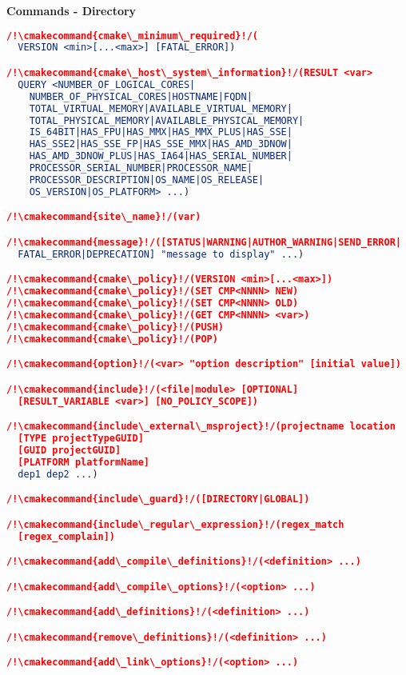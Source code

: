 \documentclass{article}
\newcommand{\cmakecommand}[1]{{\href{https://cmake.org/cmake/help/v3.13/command/#1.html}{#1}}}
\begin{document}
\tiny

\begin{minipage}[t]{0.18\linewidth}
\textbf{Commands - Directory}
\begin{lstlisting}[language=CMake]
/!\cmakecommand{cmake\_minimum\_required}!/(
  VERSION <min>[...<max>] [FATAL_ERROR])

/!\cmakecommand{cmake\_host\_system\_information}!/(RESULT <var>
  QUERY <NUMBER_OF_LOGICAL_CORES|
    NUMBER_OF_PHYSICAL_CORES|HOSTNAME|FQDN|
    TOTAL_VIRTUAL_MEMORY|AVAILABLE_VIRTUAL_MEMORY|
    TOTAL_PHYSICAL_MEMORY|AVAILABLE_PHYSICAL_MEMORY|
    IS_64BIT|HAS_FPU|HAS_MMX|HAS_MMX_PLUS|HAS_SSE|
    HAS_SSE2|HAS_SSE_FP|HAS_SSE_MMX|HAS_AMD_3DNOW|
    HAS_AMD_3DNOW_PLUS|HAS_IA64|HAS_SERIAL_NUMBER|
    PROCESSOR_SERIAL_NUMBER|PROCESSOR_NAME|
    PROCESSOR_DESCRIPTION|OS_NAME|OS_RELEASE|
    OS_VERSION|OS_PLATFORM> ...)

/!\cmakecommand{site\_name}!/(var)

/!\cmakecommand{message}!/([STATUS|WARNING|AUTHOR_WARNING|SEND_ERROR|
  FATAL_ERROR|DEPRECATION] "message to display" ...)

/!\cmakecommand{cmake\_policy}!/(VERSION <min>[...<max>])
/!\cmakecommand{cmake\_policy}!/(SET CMP<NNNN> NEW)
/!\cmakecommand{cmake\_policy}!/(SET CMP<NNNN> OLD)
/!\cmakecommand{cmake\_policy}!/(GET CMP<NNNN> <var>)
/!\cmakecommand{cmake\_policy}!/(PUSH)
/!\cmakecommand{cmake\_policy}!/(POP)

/!\cmakecommand{option}!/(<var> "option description" [initial value])

/!\cmakecommand{include}!/(<file|module> [OPTIONAL]
  [RESULT_VARIABLE <var>] [NO_POLICY_SCOPE])

/!\cmakecommand{include\_external\_msproject}!/(projectname location
  [TYPE projectTypeGUID]
  [GUID projectGUID]
  [PLATFORM platformName]
  dep1 dep2 ...)

/!\cmakecommand{include\_guard}!/([DIRECTORY|GLOBAL])

/!\cmakecommand{include\_regular\_expression}!/(regex_match
  [regex_complain])

/!\cmakecommand{add\_compile\_definitions}!/(<definition> ...)

/!\cmakecommand{add\_compile\_options}!/(<option> ...)

/!\cmakecommand{add\_definitions}!/(<definition> ...)

/!\cmakecommand{remove\_definitions}!/(<definition> ...)

/!\cmakecommand{add\_link\_options}!/(<option> ...)


\end{lstlisting}
\end{minipage}
\end{document}
